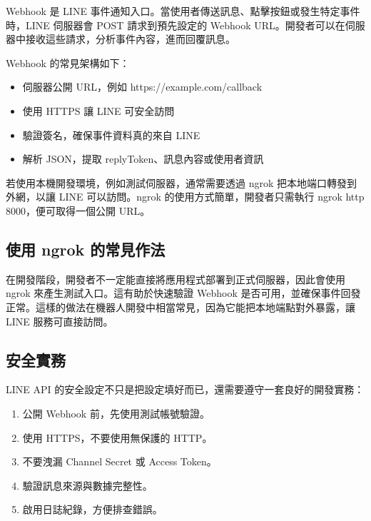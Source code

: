 Webhook 是 LINE 事件通知入口。當使用者傳送訊息、點擊按鈕或發生特定事件時，LINE 伺服器會 POST 請求到預先設定的 Webhook URL。開發者可以在伺服器中接收這些請求，分析事件內容，進而回覆訊息。

Webhook 的常見架構如下：
\begin{itemize}[leftmargin=2em]
    \item 伺服器公開 URL，例如 https://example.com/callback
    \item 使用 HTTPS 讓 LINE 可安全訪問
    \item 驗證簽名，確保事件資料真的來自 LINE
    \item 解析 JSON，提取 replyToken、訊息內容或使用者資訊
\end{itemize}

若使用本機開發環境，例如測試伺服器，通常需要透過 ngrok 把本地端口轉發到外網，以讓 LINE 可以訪問。ngrok 的使用方式簡單，開發者只需執行 ngrok http 8000，便可取得一個公開 URL。

\subsection{使用 ngrok 的常見作法}

在開發階段，開發者不一定能直接將應用程式部署到正式伺服器，因此會使用 ngrok 來產生測試入口。這有助於快速驗證 Webhook 是否可用，並確保事件回發正常。這樣的做法在機器人開發中相當常見，因為它能把本地端點對外暴露，讓 LINE 服務可直接訪問。

\subsection{安全實務}

LINE API 的安全設定不只是把設定填好而已，還需要遵守一套良好的開發實務：
\begin{enumerate}[leftmargin=2em]
    \item 公開 Webhook 前，先使用測試帳號驗證。
    \item 使用 HTTPS，不要使用無保護的 HTTP。
    \item 不要洩漏 Channel Secret 或 Access Token。
    \item 驗證訊息來源與數據完整性。
    \item 啟用日誌紀錄，方便排查錯誤。
\end{enumerate}

